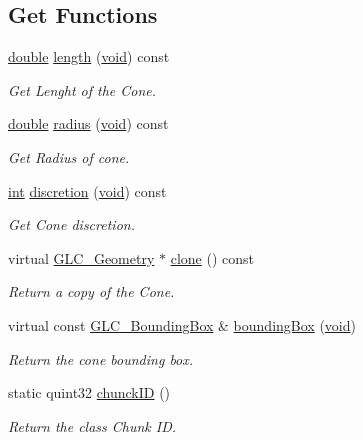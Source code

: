 \subsection*{Get Functions}
\begin{DoxyCompactItemize}
\item 
\hyperlink{_super_l_u_support_8h_a8956b2b9f49bf918deed98379d159ca7}{double} \hyperlink{class_g_l_c___cone_acaaef668ddfdc88364447ec6b5fdd695}{length} (\hyperlink{group___u_a_v_objects_plugin_ga444cf2ff3f0ecbe028adce838d373f5c}{void}) const 
\begin{DoxyCompactList}\small\item\em Get Lenght of the Cone. \end{DoxyCompactList}\item 
\hyperlink{_super_l_u_support_8h_a8956b2b9f49bf918deed98379d159ca7}{double} \hyperlink{class_g_l_c___cone_a1f22596e5ddaccd8a663e07f4e56f7b1}{radius} (\hyperlink{group___u_a_v_objects_plugin_ga444cf2ff3f0ecbe028adce838d373f5c}{void}) const 
\begin{DoxyCompactList}\small\item\em Get Radius of cone. \end{DoxyCompactList}\item 
\hyperlink{ioapi_8h_a787fa3cf048117ba7123753c1e74fcd6}{int} \hyperlink{class_g_l_c___cone_ad84cbd14aed2785a375b6a029c943e73}{discretion} (\hyperlink{group___u_a_v_objects_plugin_ga444cf2ff3f0ecbe028adce838d373f5c}{void}) const 
\begin{DoxyCompactList}\small\item\em Get Cone discretion. \end{DoxyCompactList}\item 
virtual \hyperlink{class_g_l_c___geometry}{G\-L\-C\-\_\-\-Geometry} $\ast$ \hyperlink{class_g_l_c___cone_aabb3ea1c3ce6a7bf4366d68397df04c8}{clone} () const 
\begin{DoxyCompactList}\small\item\em Return a copy of the Cone. \end{DoxyCompactList}\item 
virtual const \hyperlink{class_g_l_c___bounding_box}{G\-L\-C\-\_\-\-Bounding\-Box} \& \hyperlink{class_g_l_c___cone_ac7e53aaa00ec7ccb64f3eb64232aa110}{bounding\-Box} (\hyperlink{group___u_a_v_objects_plugin_ga444cf2ff3f0ecbe028adce838d373f5c}{void})
\begin{DoxyCompactList}\small\item\em Return the cone bounding box. \end{DoxyCompactList}\item 
static quint32 \hyperlink{class_g_l_c___cone_a7e44c53e0dc295e4b2623d945152a51c}{chunck\-I\-D} ()
\begin{DoxyCompactList}\small\item\em Return the class Chunk I\-D. \end{DoxyCompactList}\end{DoxyCompactItemize}
